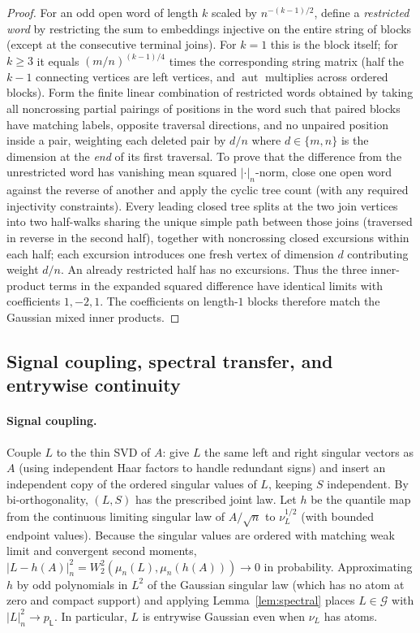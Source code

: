 \documentclass[11pt]{article}
\theoremstyle{plain}
\theoremstyle{definition}
\theoremstyle{remark}
\DeclareMathOperator{\aut}{aut}
\newcommand{\sL}{\mathsf{L}}
\begin{document}
\begin{proof}
For an odd open word of length $k$ scaled by $n^{-(k-1)/2}$, define a \emph{restricted word} by restricting the sum to embeddings injective on the entire string of blocks (except at the consecutive terminal joins). For $k = 1$ this is the block itself; for $k \ge 3$ it equals $(m/n)^{(k-1)/4}$ times the corresponding string matrix (half the $k-1$ connecting vertices are left vertices, and $\aut$ multiplies across ordered blocks). Form the finite linear combination of restricted words obtained by taking all noncrossing partial pairings of positions in the word such that paired blocks have matching labels, opposite traversal directions, and no unpaired position inside a pair, weighting each deleted pair by $d/n$ where $d \in \{m, n\}$ is the dimension at the \emph{end} of its first traversal. To prove that the difference from the unrestricted word has vanishing mean squared $|\cdot|_n$-norm, close one open word against the reverse of another and apply the cyclic tree count (with any required injectivity constraints). Every leading closed tree splits at the two join vertices into two half-walks sharing the unique simple path between those joins (traversed in reverse in the second half), together with noncrossing closed excursions within each half; each excursion introduces one fresh vertex of dimension $d$ contributing weight $d/n$. An already restricted half has no excursions. Thus the three inner-product terms in the expanded squared difference have identical limits with coefficients $1, -2, 1$. The coefficients on length-$1$ blocks therefore match the Gaussian mixed inner products.
\end{proof}

\subsection{Signal coupling, spectral transfer, and entrywise continuity}

\paragraph{Signal coupling.}
Couple $L$ to the thin SVD of $A$: give $L$ the same left and right singular vectors as $A$ (using independent Haar factors to handle redundant signs) and insert an independent copy of the ordered singular values of $L$, keeping $S$ independent. By bi-orthogonality, $(L, S)$ has the prescribed joint law. Let $h$ be the quantile map from the continuous limiting singular law of $A/\sqrt{n}$ to $\nu_L^{1/2}$ (with bounded endpoint values). Because the singular values are ordered with matching weak limit and convergent second moments, $|L - h(A)|_n^2 = W_2^2(\mu_n(L), \mu_n(h(A))) \to 0$ in probability. Approximating $h$ by odd polynomials in $L^2$ of the Gaussian singular law (which has no atom at zero and compact support) and applying Lemma~\ref{lem:spectral} places $L \in \mathcal{G}$ with $|L|_n^2 \to p_{\sL}$. In particular, $L$ is entrywise Gaussian even when $\nu_L$ has atoms.
\end{document}
